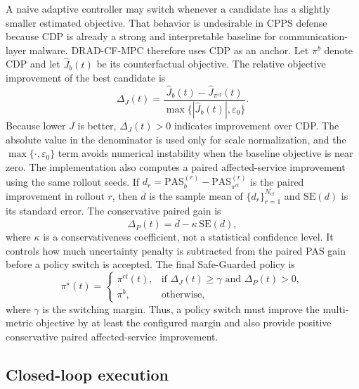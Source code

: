 \documentclass[lettersize,journal]{IEEEtran}
\begin{document}
A naive adaptive controller may switch whenever a candidate has a slightly smaller estimated objective. That behavior is undesirable in CPPS defense because CDP is already a strong and interpretable baseline for communication-layer malware. DRAD-CF-MPC therefore uses CDP as an anchor. Let $\pi^b$ denote CDP and let $\widehat{J}_b(t)$ be its counterfactual objective. The relative objective improvement of the best candidate is
\begin{equation}
    \Delta_J(t)
    =
    \frac{\widehat{J}_b(t)-\widehat{J}_{\pi^{\mathrm{cf}}}(t)}
    {\max\{|\widehat{J}_b(t)|,\varepsilon_0\}}.
    \label{eq:objective_improvement}
\end{equation}
Because lower $\widehat{J}$ is better, $\Delta_J(t)>0$ indicates improvement over CDP. The absolute value in the denominator is used only for scale normalization, and the $\max\{\cdot,\varepsilon_0\}$ term avoids numerical instability when the baseline objective is near zero. The implementation also computes a paired affected-service improvement using the same rollout seeds. If $d_r=\mathrm{PAS}_{b}^{(r)}-\mathrm{PAS}_{\pi^{\mathrm{cf}}}^{(r)}$ is the paired improvement in rollout $r$, then $\overline{d}$ is the sample mean of $\{d_r\}_{r=1}^{N_{\mathrm{cf}}}$ and $\mathrm{SE}(d)$ is its standard error. The conservative paired gain is
\begin{equation}
    \Delta_P(t)=\overline{d}-\kappa\,\mathrm{SE}(d),
    \label{eq:paired_gain}
\end{equation}
where $\kappa$ is a conservativeness coefficient, not a statistical confidence level. It controls how much uncertainty penalty is subtracted from the paired PAS gain before a policy switch is accepted. The final Safe-Guarded policy is
\begin{equation}
    \pi^{\star}(t)
    =
    \begin{cases}
    \pi^{\mathrm{cf}}(t), & \text{if } \Delta_J(t)\geq\gamma \text{ and } \Delta_P(t)>0,\\
    \pi^{b}, & \text{otherwise},
    \end{cases}
    \label{eq:safeguard_policy}
\end{equation}
where $\gamma$ is the switching margin. Thus, a policy switch must improve the multi-metric objective by at least the configured margin and also provide positive conservative paired affected-service improvement.

\subsection{Closed-loop execution}
\label{subsec:closed_loop_execution}
\end{document}
